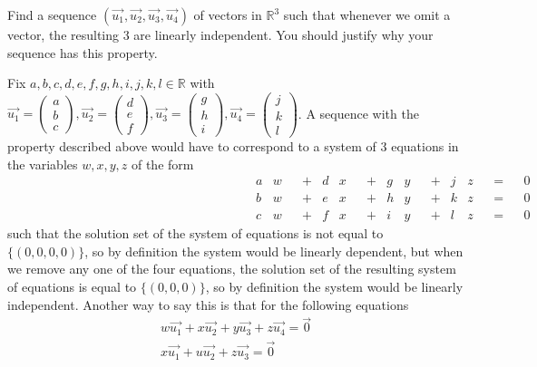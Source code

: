 \documentclass[12pt]{article}
\newenvironment{problem}[2][Problem]
{
	\begin{trivlist} 
		\item[\hskip \labelsep {\bfseries #1 #2:}]
	}
{
	\end{trivlist}
	}
\newenvironment{solution}[1][Solution]
{
	\begin{trivlist} 
		\item[\hskip \labelsep {\itshape #1:}]
	}
	{
	\end{trivlist}
}
\begin{document}
\newpage
\begin{problem}{5}
Find a sequence $(\vec{u_1},\vec{u_2},\vec{u_3},\vec{u_4})$ of vectors in $\mathbb{R}^3$ such that whenever we omit a vector, the resulting 3 are linearly independent. You should justify why your sequence has this property.
\noindent
\newline
\newline
\begin{solution}
Fix $a,b,c,d,e,f,g,h,i,j,k,l \in \mathbb{R}$ with $\vec{u_1} = \begin{pmatrix}a\\b\\c\end{pmatrix}, \vec{u_2} = \begin{pmatrix} d\\e\\f\end{pmatrix}, \vec{u_3} = \begin{pmatrix}g\\h\\i\end{pmatrix}, \vec{u_4} = \begin{pmatrix}j\\k\\l\end{pmatrix}$. A sequence with the property described above would have to correspond to a system of 3 equations in the variables $w,x,y,z$ of the form
\begin{align*}
&&&&&&&& &&&&&&&& &&&&&&&& a&w& &+& d&x& &+& g&y& &+& j&z& &=& &0& &&&&&&&& &&&&&&&& &&&&&&&&\\
&&&&&&&& &&&&&&&& &&&&&&&& b&w& &+& e&x& &+& h&y& &+& k&z& &=& &0& &&&&&&&& &&&&&&&& &&&&&&&&\\
&&&&&&&& &&&&&&&& &&&&&&&& c&w& &+& f&x& &+& i&y& &+& l&z& &=& &0& &&&&&&&& &&&&&&&& &&&&&&&&
\end{align*}
such that the solution set of the system of equations is not equal to $\{(0,0,0,0)\}$, so by definition the system would be linearly dependent, but when we remove any one of the four equations, the solution set of the resulting system of equations is equal to $\{(0,0,0)\}$, so by definition the system would be linearly independent. Another way to say this is that for the following equations
\begin{align}
w\vec{u_1} + x\vec{u_2} + y\vec{u_3} + z\vec{u_4} = \vec{0}\\
x\vec{u_1}+u\vec{u_2}+z\vec{u_3} = \vec{0}\\

\end{align}
\end{solution}
\end{problem}
\end{document}
